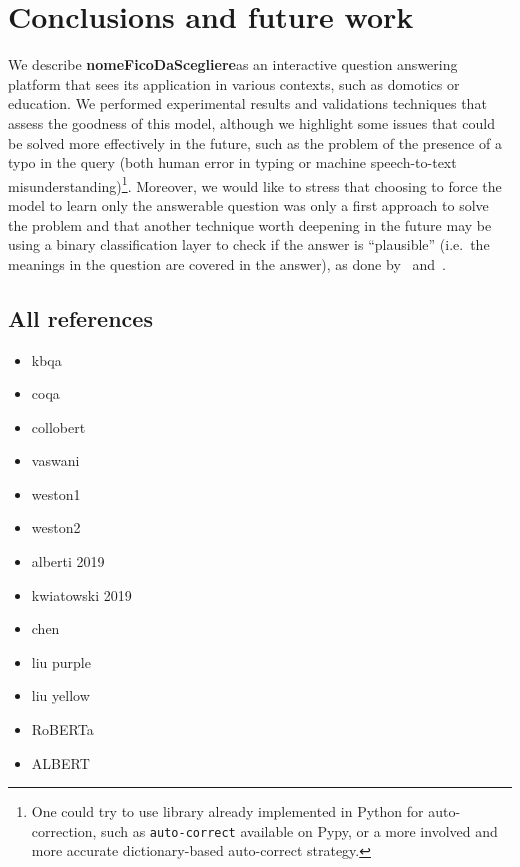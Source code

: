 \documentclass[10pt,hidelinks]{article}
\newcommand{\nomefico}{\textbf{nomeFicoDaScegliere}}
\begin{document}
\section{Conclusions and future work}\label{sec:conclusions_and_future_work}
We describe \nomefico as an interactive question answering platform that sees its application in various contexts, such as domotics or education.
We performed experimental results and validations techniques that assess the goodness of this model, although we highlight some issues that could be solved more effectively in the future, such as the problem of the presence of a typo in the query (both human error in typing or machine speech-to-text misunderstanding)\footnote{One could try to use library already implemented in Python for auto-correction, such as \texttt{auto-correct} available on Pypy, or a more involved and more accurate dictionary-based auto-correct strategy.}.
Moreover, we would like to stress that choosing to force the model to learn only the answerable question was only a first approach to solve the problem and that another technique worth deepening in the future may be using a binary classification layer to check if the answer is ``plausible'' (i.e.~the meanings in the question are covered in the answer), as done by~\cite{Hu2019ReadV} and~\cite{Back2020NeurQuRI}.


\subsection{All references}

\begin{itemize}
  \item kbqa~\cite{kbqa}    
  \item coqa~\cite{coqa}
  \item collobert~\cite{Collobert}
  \item vaswani~\cite{vaswani}
  \item weston1~\cite{weston-tracking}
  \item weston2~\cite{weston-reading}
  \item alberti 2019~\cite{alberti}
  \item kwiatowski 2019~\cite{kwiatowski}
  \item chen~\cite{chen}
  \item liu purple~\cite{liu-purple}
  \item liu yellow~\cite{liu-yellow}
  \item RoBERTa~\cite{roberta}
  \item ALBERT~\cite{albert}
\end{itemize}




\end{document}
